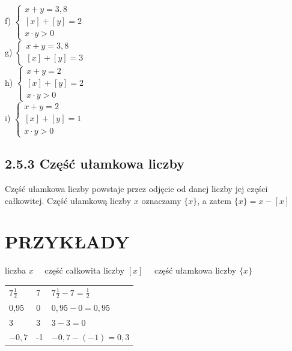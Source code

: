 \documentclass[10pt]{article}
\begin{document}
f) \(\left\{\begin{array}{l}x+y=3,8 \\ {[x]+[y]=2} \\ x \cdot y>0\end{array}\right.\)\\
g) \(\left\{\begin{array}{l}x+y=3,8 \\ {[x]+[y]=3}\end{array}\right.\)\\
h) \(\left\{\begin{array}{l}x+y=2 \\ {[x]+[y]=2} \\ x \cdot y>0\end{array}\right.\)\\
i) \(\left\{\begin{array}{l}x+y=2 \\ {[x]+[y]=1} \\ x \cdot y>0\end{array}\right.\)

\subsection*{2.5.3 Część ułamkowa liczby}
Część ułamkowa liczby powstaje przez odjęcie od danej liczby jej części całkowitej. Część ułamkową liczby \(x\) oznaczamy \(\{x\}\), a zatem \(\{x\}=x-[x]\)

\section*{PRZYKŁADY}
liczba \(x \quad\) część całkowita liczby \([x] \quad\) część ułamkowa liczby \(\{x\}\)

\begin{center}
\begin{tabular}{lll}
\(7 \frac{1}{2}\) & 7 & \(7 \frac{1}{2}-7=\frac{1}{2}\) \\
0,95 & 0 & \(0,95-0=0,95\) \\
3 & 3 & \(3-3=0\) \\
\(-0,7\) & -1 & \(-0,7-(-1)=0,3\) \\
\end{tabular}
\end{center}
\end{document}

